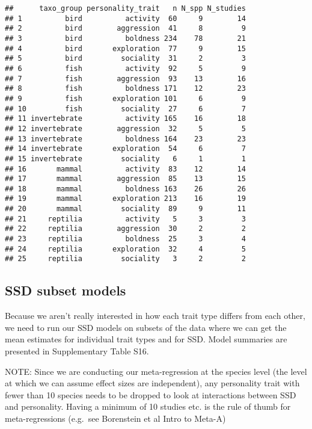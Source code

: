\documentclass[]{article}
\begin{document}
\begin{verbatim}
##      taxo_group personality_trait   n N_spp N_studies
## 1          bird          activity  60     9        14
## 2          bird        aggression  41     8         9
## 3          bird          boldness 234    78        21
## 4          bird       exploration  77     9        15
## 5          bird         sociality  31     2         3
## 6          fish          activity  92     5         9
## 7          fish        aggression  93    13        16
## 8          fish          boldness 171    12        23
## 9          fish       exploration 101     6         9
## 10         fish         sociality  27     6         7
## 11 invertebrate          activity 165    16        18
## 12 invertebrate        aggression  32     5         5
## 13 invertebrate          boldness 164    23        23
## 14 invertebrate       exploration  54     6         7
## 15 invertebrate         sociality   6     1         1
## 16       mammal          activity  83    12        14
## 17       mammal        aggression  85    13        15
## 18       mammal          boldness 163    26        26
## 19       mammal       exploration 213    16        19
## 20       mammal         sociality  89     9        11
## 21     reptilia          activity   5     3         3
## 22     reptilia        aggression  30     2         2
## 23     reptilia          boldness  25     3         4
## 24     reptilia       exploration  32     4         5
## 25     reptilia         sociality   3     2         2
\end{verbatim}

\subsection{SSD subset models}\label{ssd-subset-models}

Because we aren't really interested in how each trait type differs from
each other, we need to run our SSD models on subsets of the data where
we can get the mean estimates for individual trait types and for SSD.
Model summaries are presented in Supplementary Table S16.

NOTE: Since we are conducting our meta-regression at the species level
(the level at which we can assume effect sizes are independent), any
personality trait with fewer than 10 species needs to be dropped to look
at interactions between SSD and personality. Having a minimum of 10
studies etc. is the rule of thumb for meta-regressions (e.g.~see
Borenstein et al Intro to Meta-A)
\end{document}
